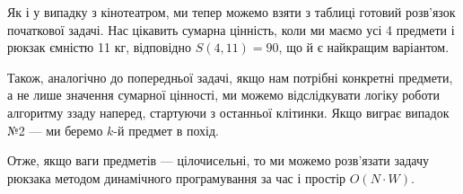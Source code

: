 \documentclass[12pt,a4paper]{report}
\begin{document}
\begin{center}
\end{center}

Як і у випадку з кінотеатром, ми тепер можемо взяти з таблиці готовий розв’язок початкової задачі. Нас цікавить сумарна цінність, коли ми маємо усі 4 предмети і рюкзак ємністю 11 кг, відповідно \(S(4, 11) = 90\), що й є найкращим варіантом.

Також, аналогічно до попередньої задачі, якщо нам потрібні конкретні предмети, а не лише значення сумарної цінності, ми можемо відслідкувати логіку роботи алгоритму ззаду наперед, стартуючи з останньої клітинки. Якщо виграє випадок №2 --- ми беремо \(k\)-й предмет в похід.

Отже, якщо ваги предметів --- цілочисельні, то ми можемо розв’язати задачу рюкзака методом динамічного програмування за час і простір \(O(N \cdot W)\).
\end{document}
